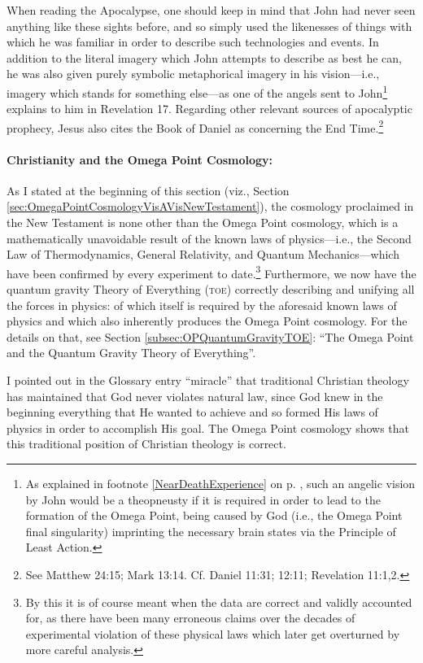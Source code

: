 \documentclass[letterpaper,12pt]{article}
\begin{document}
When reading the Apocalypse, one should keep in mind that John had never seen anything like these sights before, and so simply used the likenesses of things with which he was familiar in order to describe such technologies and events. In addition to the literal imagery which John attempts to describe as best he can, he was also given purely symbolic metaphorical imagery in his vision---i.e., imagery which stands for something else---as one of the angels sent to John\footnote{As explained in footnote \ref{NearDeathExperience} on p. \pageref{NearDeathExperience}, such an angelic vision by John would be a theopneusty if it is required in order to lead to the formation of the Omega Point, being caused by God (i.e., the Omega Point final singularity) imprinting the necessary brain states via the Principle of Least Action.} explains to him in Revelation 17. Regarding other relevant sources of apocalyptic prophecy, Jesus also cites the Book of Daniel as concerning the End Time.\footnote{See Matthew 24:15; Mark 13:14. Cf. Daniel 11:31; 12:11; Revelation 11:1,2.}

\paragraph{Christianity and the Omega Point Cosmology:}
\label{parag:ChristianityAndOmegaPointCosmology}

As I stated at the beginning of this section (viz., Section \ref{sec:OmegaPointCosmologyVisAVisNewTestament}), the cosmology proclaimed in the New Testament is none other than the Omega Point cosmology, which is a mathematically unavoidable result of the known laws of physics---i.e., the Second Law of Thermodynamics, General Relativity, and Quantum Mechanics---which have been confirmed by every experiment to date.\footnote{By this it is of course meant when the data are correct and validly accounted for, as there have been many erroneous claims over the decades of experimental violation of these physical laws which later get overturned by more careful analysis.} Furthermore, we now have the quantum gravity Theory of Everything (\textsc{toe}) correctly describing and unifying all the forces in physics: of which itself is required by the aforesaid known laws of physics and which also inherently produces the Omega Point cosmology. For the details on that, see Section \ref{subsec:OPQuantumGravityTOE}: ``The Omega Point and the Quantum Gravity Theory of Everything''.

I pointed out in the Glossary entry ``\gls{miracle}'' that traditional Christian theology has maintained that God never violates natural law, since God knew in the beginning everything that He wanted to achieve and so formed His laws of physics in order to accomplish His goal. The Omega Point cosmology shows that this traditional position of Christian theology is correct.
\end{document}
